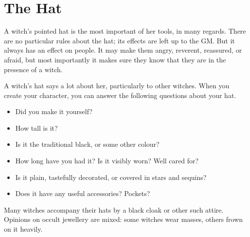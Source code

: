 \section{The Hat}

A witch's pointed hat is the most important of her tools, in many regards.
There are no particular rules about the hat; its effects are left up to the GM.
But it always has an effect on people.
It may make them angry, reverent, reassured, or afraid, but most importantly it makes sure they know that they are in the presence of a witch.

A witch's hat says a lot about her, particularly to other witches.
When you create your character, you can answer the following questions about your hat.

\begin{itemize}
	\item Did you make it yourself?
	\item How tall is it?
	\item Is it the traditional black, or some other colour?
	\item How long have you had it?
		Is it visibly worn?
		Well cared for?
	\item Is it plain, tastefully decorated, or covered in stars and sequins?
	\item Does it have any useful accessories?
		Pockets?
\end{itemize}

Many witches accompany their hats by a black cloak or other such attire.
Opinions on occult jewellery are mixed: some witches wear masses, others frown on it heavily.
